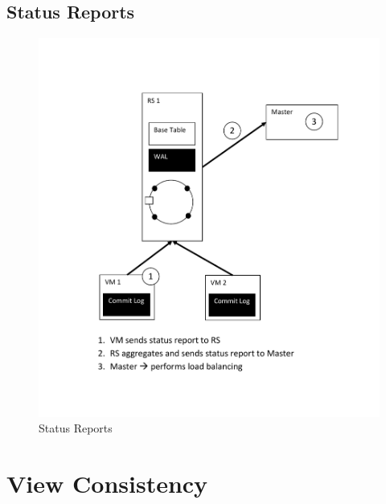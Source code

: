 \section{Status Reports}
\begin{figure}[h!]
  
  \centering
    \includegraphics[width=\linewidth]{figures/SO_StatusReports}
    \caption{Status Reports}
    \label{fig:statusreports}
\end{figure}

\chapter{View Consistency}
\label{chapter:viewconsistencyappendix}


